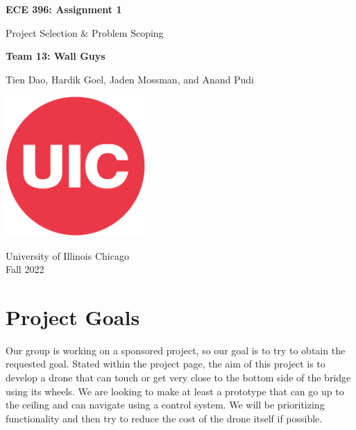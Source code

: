 \documentclass[12pt]{article}
\begin{document}
    \begin{titlepage}
        \begin{center}
            \vspace*{1cm}
            \Huge\textbf{ECE 396: Assignment 1}

                \vspace{0.5cm}
                \LARGE Project Selection \& Problem Scoping
    
            \vspace{1.5cm}
            \textbf{Team 13: Wall Guys}

                \vspace{0.5cm}
                Tien Dao, Hardik Goel, Jaden Mossman, and Anand Pudi

            \vfill             
            \includegraphics[width=0.4\textwidth]{resources/uic_logo.png}

            \vspace{0.8cm}
            University of Illinois Chicago\\
            Fall 2022
                
        \end{center}
    \end{titlepage}

    \tableofcontents

    \newpage

    \section{Project Goals}
        Our group is working on a sponsored project, so our goal is to try to obtain the requested goal. Stated within the project page, the aim of this project is to develop a drone that can touch or get very close to the bottom side of the bridge using its wheels. We are looking to make at least a prototype that can go up to the ceiling and can navigate using a control system. We will be prioritizing functionality and then try to reduce the cost of the drone itself if possible.
\end{document}

